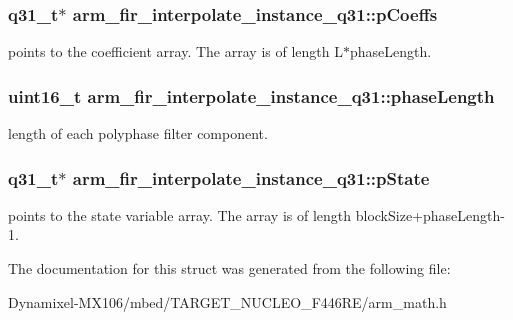\subsubsection[{\texorpdfstring{p\+Coeffs}{pCoeffs}}]{\setlength{\rightskip}{0pt plus 5cm}q31\+\_\+t$\ast$ arm\+\_\+fir\+\_\+interpolate\+\_\+instance\+\_\+q31\+::p\+Coeffs}\hypertarget{structarm__fir__interpolate__instance__q31_afa719433687e1936ec3403d0d32f06e6}{}\label{structarm__fir__interpolate__instance__q31_afa719433687e1936ec3403d0d32f06e6}
points to the coefficient array. The array is of length L$\ast$phase\+Length. 
\subsubsection[{\texorpdfstring{phase\+Length}{phaseLength}}]{\setlength{\rightskip}{0pt plus 5cm}uint16\+\_\+t arm\+\_\+fir\+\_\+interpolate\+\_\+instance\+\_\+q31\+::phase\+Length}\hypertarget{structarm__fir__interpolate__instance__q31_a5d243796584afc7cd6c557f00b7acca5}{}\label{structarm__fir__interpolate__instance__q31_a5d243796584afc7cd6c557f00b7acca5}
length of each polyphase filter component. 
\subsubsection[{\texorpdfstring{p\+State}{pState}}]{\setlength{\rightskip}{0pt plus 5cm}q31\+\_\+t$\ast$ arm\+\_\+fir\+\_\+interpolate\+\_\+instance\+\_\+q31\+::p\+State}\hypertarget{structarm__fir__interpolate__instance__q31_addde04514b6e6ac72be3d609f0398b1a}{}\label{structarm__fir__interpolate__instance__q31_addde04514b6e6ac72be3d609f0398b1a}
points to the state variable array. The array is of length block\+Size+phase\+Length-\/1. 

The documentation for this struct was generated from the following file\+:\begin{DoxyCompactItemize}
\item 
Dynamixel-\/\+M\+X106/mbed/\+T\+A\+R\+G\+E\+T\+\_\+\+N\+U\+C\+L\+E\+O\+\_\+\+F446\+R\+E/arm\+\_\+math.\+h\end{DoxyCompactItemize}
